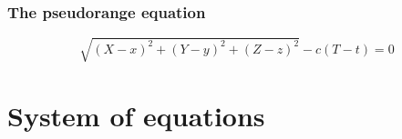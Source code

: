 \documentclass[aspectratio=169, xcolor=table]{beamer}
\begin{document}
\begin{frame}
  \hspace{0.5cm}%
\end{frame}

\begin{frame}
  \frametitle{The pseudorange equation}

  \[\sqrt{(X - x)^2 + (Y - y)^2 + (Z - z)^2} - c (T - t) = 0\]
\end{frame}

\section{System of equations}
\end{document}
